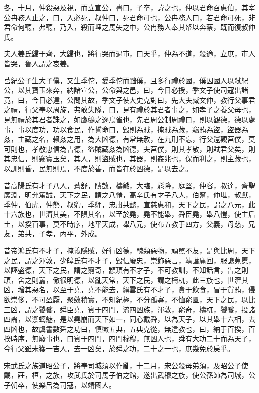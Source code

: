 \documentclass{ctexart}
\begin{document}
冬，十月，仲殺惡及視，而立宣公，書曰，子卒，諱之也，仲以君命召惠伯，其宰公冉務人止之，曰，入必死，叔仲曰，死君命可也，公冉務人曰，若君命可死，非君命何聽，弗聽，乃入，殺而埋之馬矢之中，公冉務人奉其帑以奔蔡，既而復叔仲氏。

夫人姜氏歸于齊，大歸也，將行哭而過市，曰天乎，仲為不道，殺適，立庶，市人皆哭，魯人謂之哀姜。

莒紀公子生大子僕，又生季佗，愛季佗而黜僕，且多行禮於國，僕因國人以弒紀公，以其寶玉來奔，納諸宣公，公命與之邑，曰，今日必授，季文子使司寇出諸竟，曰，今日必達，公問其故，季文子使大史克對曰，先大夫臧文仲，教行父事君之禮，行父奉以周旋，弗敢失隊，曰，見有禮於其君者事之，如孝子之養父母也，見無禮於其君者誅之，如鷹鸇之逐鳥雀也，先君周公制周禮曰，則以觀德，德以處事，事以度功，功以食民，作誓命曰，毀則為賊，掩賊為藏，竊賄為盜，盜器為姦，主藏之名，賴姦之用，為大凶德，有常無赦，在九刑不忘，行父還觀莒僕，莫可則也，孝敬忠信為吉德，盜賊藏姦為凶德，夫莒僕，則其孝敬，則弒君父矣，則其忠信，則竊寶玉矣，其人，則盜賊也，其器，則姦兆也，保而利之，則主藏也，以訓則昏，民無則焉，不度於善，而皆在於凶德，是以去之。

昔高陽氏有才子八人，蒼舒，隤敳，檮戭，大臨，尨降，庭堅，仲容，叔達，齊聖廣淵，明允篤誠，天下之民，謂之八愷，高辛氏有才子八人，伯奮，仲堪，叔獻，季仲，伯虎，仲熊，叔豹，季貍，忠肅共懿，宣慈惠和，天下之民，謂之八元，此十六族也，世濟其美，不隕其名，以至於堯，堯不能舉，舜臣堯，舉八愷，使主后土，以揆百事，莫不時序，地平天成，舉八元，使布五教于四方，父義，母慈，兄友，弟共，子孝，內平，外成。

昔帝鴻氏有不才子，掩義隱賊，好行凶德，醜類惡物，頑嚚不友，是與比周，天下之民，謂之渾敦，少皞氏有不才子，毀信廢忠，崇飾惡言，靖譖庸回，服讒蒐慝，以誣盛德，天下之民，謂之窮奇，顓頊有不才子，不可教訓，不知話言，告之則頑，舍之則嚚，傲很明德，以亂天常，天下之民，謂之檮杌，此三族也，世濟其凶，增其惡名，以至于堯，堯不能去，縉雲氏有不才子，貪于飲食，冒于貨賄，侵欲崇侈，不可盈厭，聚斂積實，不知紀極，不分孤寡，不恤窮匱，天下之民，以比三凶，謂之饕餮，舜臣堯，賓于四門，流四凶族，渾敦，窮奇，檮杌，饕餮，投諸四裔，以禦螭魅，是以堯崩而天下如一，同心戴舜，以為天子，以其舉十六相，去四凶也，故虞書數舜之功曰，慎徽五典，五典克從，無違教也，曰，納于百揆，百揆時序，無廢事也，曰賓于四門，四門穆穆，無凶人也，舜有大功二十而為天子，今行父雖未獲一吉人，去一凶矣，於舜之功，二十之一也，庶幾免於戾乎。

宋武氏之族道昭公子，將奉司城須以作亂，十二月，宋公殺母弟須，及昭公子使戴，莊，桓，之族，攻武氏於司馬子伯之館，遂出武穆之族，使公孫師為司城，公子朝卒，使樂呂為司寇，以靖國人。
\end{document}
